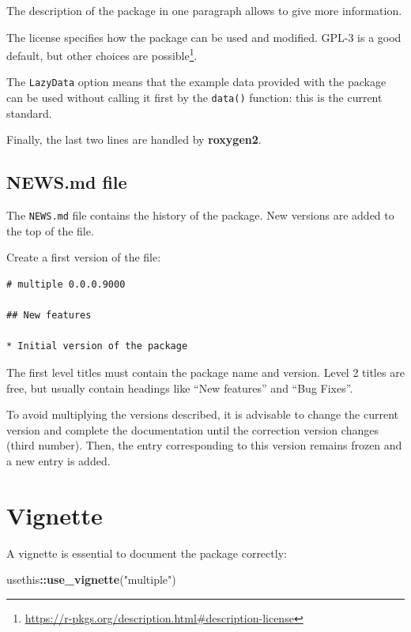 \documentclass[
  12pt,
  american,
  a4paper,
  extrafontsizes,onecolumn,openright
  ]{memoir}
\newenvironment{Shaded}{\begin{snugshade}}{\end{snugshade}}
\newcommand{\FunctionTok}[1]{\textcolor[rgb]{0.13,0.29,0.53}{\textbf{#1}}}
\newcommand{\NormalTok}[1]{#1}
\newcommand{\SpecialCharTok}[1]{\textcolor[rgb]{0.81,0.36,0.00}{\textbf{#1}}}
\newcommand{\StringTok}[1]{\textcolor[rgb]{0.31,0.60,0.02}{#1}}
\begin{document}
The description of the package in one paragraph allows to give more information.

The license specifies how the package can be used and modified.
GPL-3 is a good default, but other choices are possible\footnote{\url{https://r-pkgs.org/description.html\#description-license}}.

The \texttt{LazyData} option means that the example data provided with the package can be used without calling it first by the \texttt{data()} function: this is the current standard.

Finally, the last two lines are handled by \textbf{roxygen2}.

\subsection{NEWS.md file}\label{news.md-file}

The \texttt{NEWS.md} file contains the history of the package.
New versions are added to the top of the file.

Create a first version of the file:

\begin{verbatim}
# multiple 0.0.0.9000

## New features

* Initial version of the package
\end{verbatim}

The first level titles must contain the package name and version.
Level 2 titles are free, but usually contain headings like \enquote{New features} and \enquote{Bug Fixes}.

To avoid multiplying the versions described, it is advisable to change the current version and complete the documentation until the correction version changes (third number).
Then, the entry corresponding to this version remains frozen and a new entry is added.

\section{Vignette}\label{vignette}

A vignette is essential to document the package correctly:

\scriptsize

\begin{Shaded}
\begin{Highlighting}[]
\NormalTok{usethis}\SpecialCharTok{::}\FunctionTok{use\_vignette}\NormalTok{(}\StringTok{"multiple"}\NormalTok{)}
\end{Highlighting}
\end{Shaded}
\end{document}

